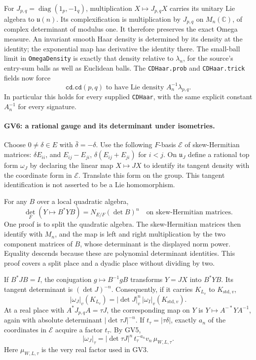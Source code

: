 For $J_{p,q}=\operatorname{diag}(1_p,-1_q)$, multiplication
$X\mapsto J_{p,q}X$ carries its unitary Lie algebra to
$\mathfrak u(n)$. Its complexification is multiplication by
$J_{p,q}$ on $M_n(\mathbb C)$, of complex determinant of modulus
one. It therefore preserves the exact Omega measure. An invariant
smooth Haar density is determined by its density at the identity;
the exponential map has derivative the identity there. The small-ball
limit in \texttt{OmegaDensity} is exactly that density relative to
$\lambda_n$, for the source's entry-sum balls as well as Euclidean
balls. The \texttt{CDHaar.prob} and \texttt{CDHaar.trick} fields now
force
\[
 \texttt{cd.cd}(p,q)\text{ to have Lie density }
                  A_n^{-1}\lambda_{p,q}.
 \tag{GV.10}
\]
In particular this holds for every supplied \texttt{CDHaar}, with
the same explicit constant $A_n^{-1}$ for every signature.

\paragraph{GV6: a rational gauge and its determinant under isometries.}
Choose $0\ne\delta\in E$ with $\bar\delta=-\delta$.
Use the following $F$-basis $\mathcal E$ of skew-Hermitian matrices:
$\delta E_{ii}$, and $E_{ij}-E_{ji}$,
$\delta(E_{ij}+E_{ji})$ for $i<j$.
On $\mathfrak u_J$ define a rational top form $\omega_J$ by declaring
the linear map $X\mapsto JX$ to identify its tangent density with
the coordinate form in $\mathcal E$. Translate this form on the group.
This tangent identification is not asserted to be a Lie homomorphism.

For any $B$ over a local quadratic algebra,
\[
 \det_F(Y\mapsto B^*YB)=N_{E/F}(\det B)^n
 \quad\text{on skew-Hermitian matrices}.
 \tag{GV.11}
\]
One proof is to split the quadratic algebra. The skew-Hermitian
matrices then identify with $M_n$, and the map is left and right
multiplication by the two component matrices of $B$, whose determinant
is the displayed norm power. Equality descends because these are
polynomial determinant identities. This proof covers a split place
and a dyadic place without dividing by two.

If $B^*JB=I$, the conjugation $g\mapsto B^{-1}gB$ transforms
$Y=JX$ into $B^*YB$. Its tangent determinant is $(\det J)^{-n}$.
Consequently, if it carries $K_{L_v}$ to $K_{\mathrm{std},v}$,
\[
 |\omega_J|_v(K_{L_v})
       =|\det J|_v^n\,|\omega_I|_v(K_{\mathrm{std},v}).
 \tag{GV.12}
\]
At a real place with $A^*J_{p,q}A=\tau J$, the corresponding map on
$Y$ is $Y\mapsto A^{-*}YA^{-1}$, again with absolute determinant
$|\det\tau J|^{-n}$. If $t_\tau=|\tau\delta|$, exactly $a_n$ of
the coordinates in $\mathcal E$ acquire a factor $t_\tau$.
By GV5,
\[
 |\omega_J|_\tau
   =|\det\tau J|^n\,t_\tau^{-a_n}v_n\,
                         \mu_{W,L,\tau}.
 \tag{GV.13}
\]
Here $\mu_{W,L,\tau}$ is the very real factor used in GV3.

